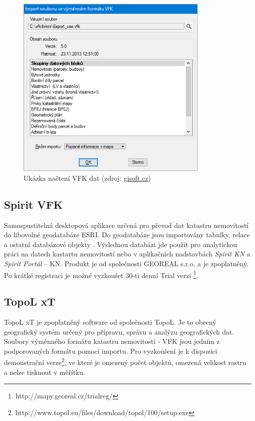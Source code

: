 \begin{figure}[H]
	 \centering
      \includegraphics[height=9cm]{./pictures/gisoft.png}
      \caption{Ukázka načtení VFK dat (zdroj:
\href{http://www.gisoft.cz/cze/files/Moduly/import-vfk.png}{gisoft.cz})}
      \label{fig:topol}
  \end{figure}
\subsection{Spirit VFK}
Samospustitelná desktopová aplikace určená pro převod dat katastru nemovitostí do libovolné geodatabáze ESRI. Do geodatabáze jsou importovány tabulky, relace a ostatní databázové objekty . Výslednou databázi jde použít pro analytickou práci na datech kastartu nemovitostí nebo v aplikačních nadstavbách \textit{Spirit KN} a \textit{Spirit Portál} -- KN. Produkt je od společnosti GEOREAL s.r.o. a je zpoplatněný. Po krátké registraci je možné vyzkoušet 30-ti denní Trial verzi \footnote{http://mapy.georeal.cz/trialreg/}.\cite{spirit_vfk}
\subsection{TopoL xT}
TopoL xT je zpoplatněný software od společnosti TopoL. Je to obecný geografický systém určený pro přípravu, správu a analýzu geografických dat. Soubory výměnného formátu katastru nemovitostí - VFK jsou jedním z podporovaných formátu pomocí importu. Pro vyzkoušení je k dispozici demonstrační verze\footnote{http://www.topol.eu/files/download/topol/100/setup.exe}, ve které je omezený počet objektů, omezená velikost rastru a nelze tisknout v měřítku.\citep{topol}

